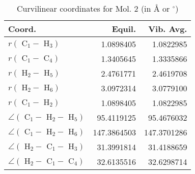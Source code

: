 \begin{table}
\centering
\caption{Curvilinear coordinates for Mol. 2 (in \AA{} or $^\circ$)}
\begin{tabular}{lrr}
       Coord.         &             Equil. &          Vib. Avg. \\
\hline
$r(\text{ C}_{1 } - \text{ H}_{3 })$ &          1.0898405 &          1.0822985 \\
$r(\text{ C}_{1 } - \text{ C}_{4 })$ &          1.3405645 &          1.3335866 \\
$r(\text{ H}_{2 } - \text{ H}_{5 })$ &          2.4761771 &          2.4619708 \\
$r(\text{ H}_{2 } - \text{ H}_{6 })$ &          3.0972314 &          3.0779100 \\
$r(\text{ C}_{1 } - \text{ H}_{2 })$ &          1.0898405 &          1.0822985 \\
$\angle(\text{ C}_{1 } - \text{ H}_{2 } - \text{ H}_{5 })$ &         95.4119125 &         95.4676032 \\
$\angle(\text{ C}_{1 } - \text{ H}_{2 } - \text{ H}_{6 })$ &        147.3864503 &        147.3701286 \\
$\angle(\text{ H}_{2 } - \text{ C}_{1 } - \text{ H}_{3 })$ &         31.3991814 &         31.4188659 \\
$\angle(\text{ H}_{2 } - \text{ C}_{1 } - \text{ C}_{4 })$ &         32.6135516 &         32.6298714 \\
\end{tabular}
\end{table}

